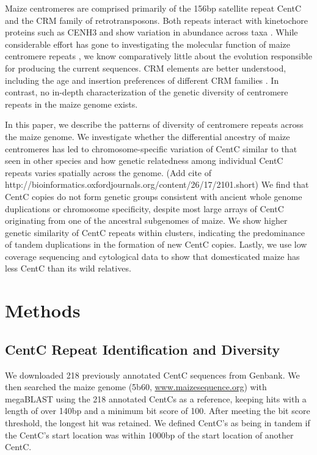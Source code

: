 Maize centromeres are comprised primarily of the 156bp satellite repeat CentC and the CRM family of retrotransposons.
Both repeats interact with kinetochore proteins such as CENH3 \citep{Wolfgruber2009, Zhong2002} and show variation in abundance across taxa \citep{Albert2010}.
While considerable effort has gone to investigating the molecular function of maize centromere repeats \citep{Ananiev1998B, Nagaki2003, Wolfgruber2009}, we know comparatively little about the evolution responsible for producing the current sequences. 
CRM elements are better understood, including the age and insertion preferences of different CRM families \citep{Wolfgruber2009, Sharma2008}.
In contrast, no in-depth characterization of the genetic diversity of centromere repeats in the maize genome exists.  

In this paper, we describe the patterns of diversity of centromere repeats across the maize genome.  
We investigate whether the differential ancestry of maize centromeres \citep{Wang2012} has led to chromosome-specific variation of CentC similar to that seen in other species \citep{Kawabe2005, Pontes2004} and how genetic relatedness among individual CentC repeats varies spatially across the genome.    (Add cite of http://bioinformatics.oxfordjournals.org/content/26/17/2101.short)
We find that CentC copies do not form genetic groups consistent with ancient whole genome duplications or chromosome specificity, despite most large arrays of CentC originating from  one of the ancestral subgenomes of maize.
We show higher genetic similarity of CentC repeats within clusters, indicating the predominance of tandem duplications in the formation of new CentC copies.
Lastly, we use low coverage sequencing and cytological data to show that domesticated maize has less CentC than its wild relatives.

\section*{Methods} 
\label{methods}

\subsection*{CentC Repeat Identification and Diversity}

We downloaded 218 previously annotated CentC sequences \citep{Ananiev1998B, Nagaki2003} from Genbank.  
We then searched the maize genome (5b60, \url{www.maizesequence.org}) with megaBLAST \citep{McGinnis2004} using the 218 annotated CentCs as a reference, keeping hits with a length of over 140bp and a minimum bit score of 100.
After meeting the bit score threshold, the longest hit was retained.
We defined CentC’s as being in tandem if the CentC’s start location was within 1000bp of the start location of another CentC.
	

